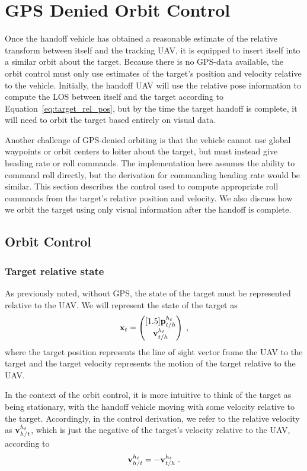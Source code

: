 \chapter{GPS Denied Orbit Control}
\label{ch:orbit_control}

Once the handoff vehicle has obtained a reasonable estimate of the relative transform between itself and the tracking UAV, it is equipped to insert itself into a similar orbit about the target.
Because there is no GPS-data available, the orbit control must only use estimates of the target's position and velocity relative to the vehicle.
Initially, the handoff UAV will use the relative pose information to compute the LOS between itself and the target according to Equation~\eqref{eq:target_rel_pos}, but by the time the target handoff is complete, it will need to orbit the target based entirely on visual data.

Another challenge of GPS-denied orbiting is that the vehicle cannot use global waypoints or orbit centers to loiter about the target, but must instead give heading rate or roll commands.
The implementation here assumes the ability to command roll directly, but the derivation for commanding heading rate would be similar.
This section describes the control used to compute appropriate roll commands from the target's relative position and velocity.
We also discuss how we orbit the target using only visual information after the handoff is complete.

\section{Orbit Control}

\subsection{Target relative state}
As previously noted, without GPS, the state of the target must be represented relative to the UAV. We will represent the state of the target as
\begin{equation}
    {\mathbf{x}}_t = \begin{pmatrix}[1.5] {\mathbf{p}}_{t/h}^{h_\ell} \\ {\mathbf{v}}_{t/h}^{h_\ell} \end{pmatrix}\;,
\end{equation}
where the target position represents the line of sight vector frome the UAV to the target and the target velocity represents the motion of the target relative to the UAV.

In the context of the orbit control, it is more intuitive to think of the target as being stationary, with the handoff vehicle moving with some velocity relative to the target.
Accordingly, in the control derivation, we refer to the relative velocity as ${\mathbf{v}}_{h/t}^{h_\ell}$, which is just the negative of the target's velocity relative to the UAV, according to
\begin{equation}
    {\mathbf{v}}_{h/t}^{h_\ell} = -{\mathbf{v}}_{t/h}^{h_\ell}\;.
\end{equation}


